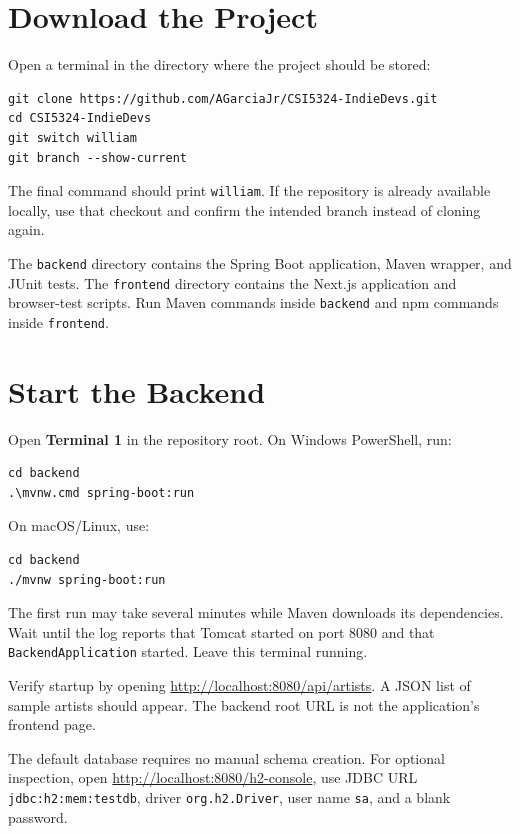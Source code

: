 \documentclass[11pt]{report}
\begin{document}
\section{Download the Project}
Open a terminal in the directory where the project should be stored:
\begin{samepage}
\begin{verbatim}
git clone https://github.com/AGarciaJr/CSI5324-IndieDevs.git
cd CSI5324-IndieDevs
git switch william
git branch --show-current
\end{verbatim}
\end{samepage}
The final command should print \texttt{william}. If the repository is already available locally, use that checkout and confirm the intended branch instead of cloning again.

The \texttt{backend} directory contains the Spring Boot application, Maven wrapper, and JUnit tests. The \texttt{frontend} directory contains the Next.js application and browser-test scripts. Run Maven commands inside \texttt{backend} and npm commands inside \texttt{frontend}.

\section{Start the Backend}
Open \textbf{Terminal 1} in the repository root. On Windows PowerShell, run:
\begin{samepage}
\begin{verbatim}
cd backend
.\mvnw.cmd spring-boot:run
\end{verbatim}
\end{samepage}
On macOS/Linux, use:
\begin{samepage}
\begin{verbatim}
cd backend
./mvnw spring-boot:run
\end{verbatim}
\end{samepage}
The first run may take several minutes while Maven downloads its dependencies. Wait until the log reports that Tomcat started on port 8080 and that \texttt{BackendApplication} started. Leave this terminal running.

Verify startup by opening \url{http://localhost:8080/api/artists}. A JSON list of sample artists should appear. The backend root URL is not the application's frontend page.

The default database requires no manual schema creation. For optional inspection, open \url{http://localhost:8080/h2-console}, use JDBC URL \texttt{jdbc:h2:mem:testdb}, driver \texttt{org.h2.Driver}, user name \texttt{sa}, and a blank password.
\end{document}
